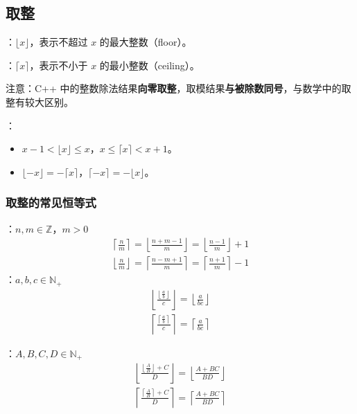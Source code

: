 \subsection{取整}

：$\lfloor x \rfloor$，表示不超过 $x$ 的最大整数（floor）。

：$\lceil x \rceil$，表示不小于 $x$ 的最小整数（ceiling）。

注意：C++ 中的整数除法结果\textbf{向零取整}，取模结果\textbf{与被除数同号}，与数学中的取整有较大区别。

：

\begin{itemize}
    \item $x - 1 < \lfloor x \rfloor \leq x$，$x \leq \lceil x \rceil < x + 1$。
    \item $\lfloor -x \rfloor = - \lceil x \rceil$，$\lceil -x \rceil = - \lfloor x \rfloor$。
\end{itemize}

\subsubsection{取整的常见恒等式}

：$n, m \in \mathbb{Z}$，$m > 0$
\[
\begin{gathered}
\left\lceil \frac{n}{m} \right\rceil = \left\lfloor \frac{n + m - 1}{m} \right\rfloor = \left\lfloor \frac{n - 1}{m} \right\rfloor + 1 \\
\left\lfloor \frac{n}{m} \right\rfloor = \left\lceil \frac{n - m + 1}{m} \right\rceil = \left\lceil \frac{n + 1}{m} \right\rceil - 1
\end{gathered}
\]
：$a, b, c \in \mathbb{N}_+$
\[
\begin{gathered}
\left\lfloor \frac{ \left\lfloor \frac{a}{b} \right\rfloor }{c} \right\rfloor = \left\lfloor \frac{a}{bc} \right\rfloor \\
\left\lceil \frac{ \left\lceil \frac{a}{b} \right\rceil }{c} \right\rceil = \left\lceil \frac{a}{bc} \right\rceil
\end{gathered}
\]

：$A, B, C, D \in \mathbb{N}_+$
\[
\begin{gathered}
\left\lfloor \frac{ \left\lfloor \frac{A}{B} \right\rfloor + C }{D} \right\rfloor = \left\lfloor \frac{A + BC}{BD} \right\rfloor \\
\left\lceil \frac{ \left\lceil \frac{A}{B} \right\rceil + C }{D} \right\rceil = \left\lceil \frac{A + BC}{BD} \right\rceil
\end{gathered}
\]


